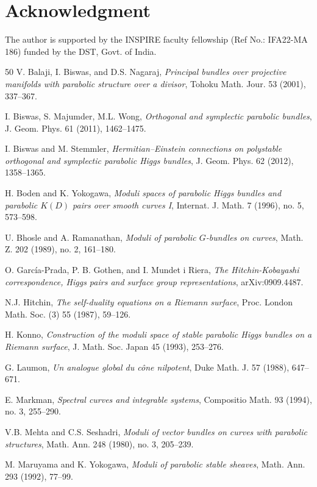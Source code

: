 \documentclass[11pt, reqno]{amsart}
\numberwithin{equation}{section}
\theoremstyle{definition}
\begin{document}
\section*{Acknowledgment}
 The author is supported by the INSPIRE faculty fellowship (Ref No.: IFA22-MA 186) funded by the DST, Govt. of India.

\begin{thebibliography}{50}
V. Balaji, I. Biswas, and D.S. Nagaraj,
\emph{Principal bundles over projective manifolds with parabolic structure over a divisor},
Tohoku Math. Jour. 53 (2001), 337–367.

I. Biswas, S. Majumder, M.L. Wong,
\emph{Orthogonal and symplectic parabolic bundles},
J. Geom. Phys. 61 (2011), 1462–1475.

I. Biswas and M. Stemmler,
\emph{Hermitian–Einstein connections on polystable orthogonal and symplectic parabolic Higgs bundles},
J. Geom. Phys. 62 (2012), 1358–1365.

H. Boden and K. Yokogawa,
\emph{Moduli spaces of parabolic Higgs bundles and parabolic $K(D)$ pairs over smooth curves I},
Internat. J. Math. 7 (1996), no. 5, 573–598.

U. Bhosle and A. Ramanathan,
\emph{Moduli of parabolic $G$-bundles on curves},
Math. Z. 202 (1989), no. 2, 161–180.

O. García-Prada, P. B. Gothen, and I. Mundet i Riera,
\emph{The Hitchin-Kobayashi correspondence, Higgs pairs and surface group representations},
arXiv:0909.4487.

N.J. Hitchin,
\emph{The self-duality equations on a Riemann surface},
Proc. London Math. Soc. (3) 55 (1987), 59–126.

H. Konno,
\emph{Construction of the moduli space of stable parabolic Higgs bundles on a Riemann surface},
J. Math. Soc. Japan 45 (1993), 253–276.

G. Laumon,
\emph{Un analogue global du cône nilpotent},
Duke Math. J. 57 (1988), 647–671.

E. Markman,
\emph{Spectral curves and integrable systems},
Compositio Math. 93 (1994), no. 3, 255–290.

V.B. Mehta and C.S. Seshadri,
\emph{Moduli of vector bundles on curves with parabolic structures},
Math. Ann. 248 (1980), no. 3, 205–239.

M. Maruyama and K. Yokogawa,
\emph{Moduli of parabolic stable sheaves},
Math. Ann. 293 (1992), 77–99.


\end{thebibliography}
\end{document}

